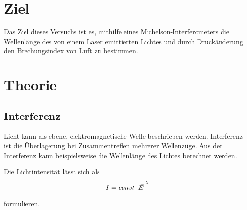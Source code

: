 \section{Ziel}
Das Ziel dieses Versuchs ist es, mithilfe eines Michelson-Interferometers die Wellenlänge des von einem Laser emittierten Lichtes und durch Druckänderung den Brechungsindex von Luft zu bestimmen.

\section{Theorie}
\label{sec:Theorie}

\subsection{Interferenz}
Licht kann als ebene, elektromagnetische Welle beschrieben werden.
Interferenz ist die Überlagerung bei Zusammentreffen mehrerer Wellenzüge.
Aus der Interferenz kann beispielsweise die Wellenlänge des Lichtes berechnet werden.



\noindent Die Lichtintensität lässt sich als
\begin{equation*}
    I = const \, \abs{\vec{E}}^{2}
    \label{eqn:intensität}
\end{equation*} 
formulieren.

